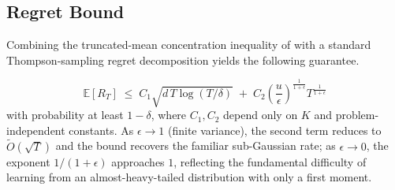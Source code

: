 \subsection{Regret Bound}
Combining the truncated-mean concentration inequality of \citet{anand2024moments} with a standard Thompson-sampling regret decomposition yields the following guarantee.

\begin{equation}
\mathbb{E}[R_T] \;\le\; C_1 \sqrt{d\,T \log(T/\delta)} \;+\; C_2 \left(\frac{u}{\epsilon}\right)^{\!\frac{1}{1+\epsilon}} T^{\frac{1}{1+\epsilon}}
\label{eq:regret-bound}
\end{equation}
with probability at least $1-\delta$, where $C_1, C_2$ depend only on $K$ and problem-independent constants. As $\epsilon \to 1$ (finite variance), the second term reduces to $\widetilde{O}(\sqrt{T})$ and the bound recovers the familiar sub-Gaussian rate; as $\epsilon \to 0$, the exponent $1/(1+\epsilon)$ approaches $1$, reflecting the fundamental difficulty of learning from an almost-heavy-tailed distribution with only a first moment.

